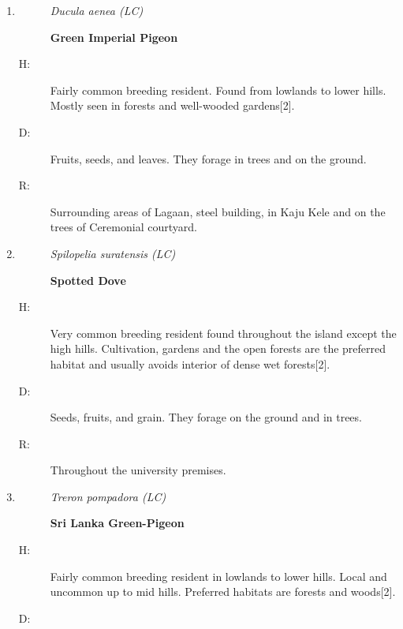 \begin{itemize}
\begin{enumerate}
\begin{description}
\item[R: ]%
Mostly observed in the library building. Uses broken ceilings as shelter there.%
\end{description}%
\item%
\begin{description}%
\item[]%
\textit{Ducula aenea (LC)}%
\item[]%
\textbf{Green Imperial Pigeon}%
\end{description}%
\begin{description}%
\item[H: ]%
Fairly common breeding resident. Found from lowlands to lower hills. Mostly seen in forests and well{-}wooded gardens{[}2{]}.%
\item[D: ]%
Fruits, seeds, and leaves. They forage in trees and on the ground.%
\item[R: ]%
Surrounding areas of Lagaan, steel building, in Kaju Kele and on the trees of Ceremonial courtyard.%
\end{description}%
\item%
\begin{description}%
\item[]%
\textit{Spilopelia suratensis (LC)}%
\item[]%
\textbf{Spotted Dove}%
\end{description}%
\begin{description}%
\item[H: ]%
Very common breeding resident found throughout the island except the high hills. Cultivation, gardens and the open forests are the preferred habitat and usually avoids interior of dense wet forests{[}2{]}.%
\item[D: ]%
Seeds, fruits, and grain. They forage on the ground and in trees.%
\item[R: ]%
Throughout the university premises.%
\end{description}%
\item%
\begin{description}%
\item[]%
\textit{Treron pompadora (LC)}%
\item[]%
\textbf{Sri Lanka Green{-}Pigeon}%
\end{description}%
\begin{description}%
\item[H: ]%
Fairly common breeding resident in lowlands to lower hills. Local and uncommon up to mid hills. Preferred habitats are forests and woods{[}2{]}.%
\item[D: ]%

\end{description}
\end{enumerate}
\end{itemize}
